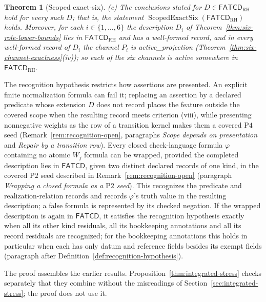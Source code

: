 \documentclass[11pt]{article}
\newtheorem{theorem}{Theorem}[section]
\theoremstyle{definition}
\newcommand{\FATCD}{\ensuremath{\mathsf{FATCD}}}
\newcommand{\ScopedExactSix}[1]{\ensuremath{\operatorname{ScopedExactSix}\!\left(#1\right)}}
\newcommand{\activeproj}{\textit{active\_\allowbreak projection}}
\newcommand{\Ptwo}{\ensuremath{\mathrm{P2}}}
\newcommand{\Pfour}{\ensuremath{\mathrm{P4}}}
\begin{document}
\begin{theorem}[Scoped exact-six]
\par\noindent\textup{(e)} The conclusions stated for \(D\in\FATCD_{\mathrm{RH}}\) hold for every
such \(D\); that is, the statement \(\ScopedExactSix{\FATCD_{\mathrm{RH}}}\) holds. Moreover, for each
\(i\in\{1,\dots,6\}\) the description \(D_i\) of
Theorem~\ref{thm:six-role-lower-bounds} lies in \(\FATCD_{\mathrm{RH}}\) and has
a well-formed record, and in every well-formed record of \(D_i\) the channel
\(P_i\) is \activeproj{} (Theorem~\ref{thm:six-channel-exactness}(iv)); so each of the six
channels is active somewhere in \(\FATCD_{\mathrm{RH}}\).
\end{theorem}

The recognition hypothesis restricts how assertions are presented. An
explicit finite normalization formula can fail it; replacing an assertion by a declared predicate
whose extension \(D\) does not record places the feature outside the covered scope when the resulting record meets criterion (viii), while presenting
nonnegative weights as the row of a transition kernel makes them a covered \Pfour{} seed
(Remark~\ref{rem:recognition-open}, paragraphs \emph{Scope depends on presentation} and \emph{Repair by a transition row}). Every closed check-language formula \(\varphi\) containing no atomic \(W_j\)
formula can be wrapped, provided the completed description lies in \FATCD{}, given two
distinct declared records of one kind, in the covered \Ptwo{} seed described in
Remark~\ref{rem:recognition-open} (paragraph \emph{Wrapping a closed formula as a \Ptwo{} seed}). This recognizes the
predicate and realization-relation records and records \(\varphi\)'s truth
value in the resulting description; a false formula is represented by its checked negation. If the wrapped description is again in \FATCD{}, it satisfies the recognition hypothesis exactly when all its other kind residuals, all its bookkeeping annotations and all its record residuals are recognized; for the bookkeeping annotations this holds in particular when each has only datum and reference fields besides its exempt fields (paragraph after Definition~\ref{def:recognition-hypothesis}).

The proof assembles the earlier results. Proposition~\ref{thm:integrated-stress}
checks separately that they combine without the misreadings of
Section~\ref{sec:integrated-stress}; the proof does not use it.
\end{document}
